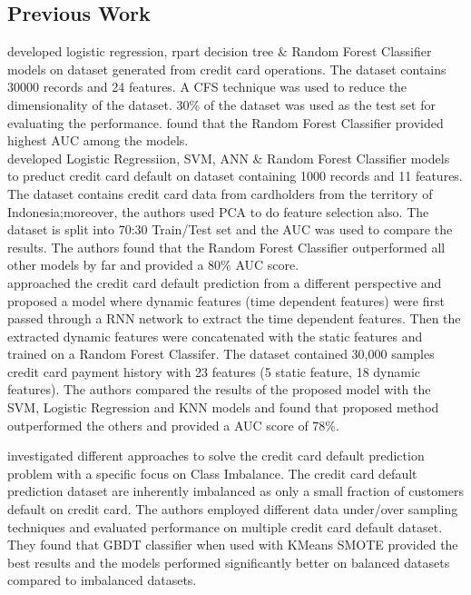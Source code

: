 \documentclass[twoside,11pt,a4paper]{article}
\begin{document}
\subsection{Previous Work}
\citep{sayjadah2018credit} developed logistic regression, rpart decision tree \& Random Forest Classifier models on dataset generated from credit card operations. The dataset contains 30000 records and 24 features. A \acf{CFS} technique was used to reduce the dimensionality of the dataset. 30\% of the dataset was used as the test set for evaluating the performance. \citep{sayjadah2018credit} found that the Random Forest Classifier provided highest \acf{AUC} among the models.\\

\citep{widyadhanacredit} developed Logistic Regressiion, \acs{SVM}, \acs{ANN} \& Random Forest Classifier models to preduct credit card default on dataset containing 1000 records and 11 features. The dataset contains credit card data from cardholders from the territory of Indonesia;moreover, the authors used \acf{PCA} to do feature selection also. The dataset is split into 70:30 Train/Test set and the \acs{AUC} was used to compare the results. The authors found that the Random Forest Classifier outperformed all other models by far and provided a 80\% \acs{AUC} score.\\

\citep{hsu2019enhanced} approached the credit card default prediction from a different perspective and proposed a model where dynamic features (time dependent features) were first passed through a \acf{RNN} network to extract the time dependent features. Then the extracted dynamic features were concatenated with the static features and trained on a Random Forest Classifer. The dataset contained 30,000 samples credit card payment history with 23 features (5 static feature, 18 dynamic features). The authors compared the results of the proposed model with the \acs{SVM}, Logistic Regression and KNN models and found that proposed method outperformed the others and provided a \acs{AUC} score of 78\%.

\citep{alam2020investigation} investigated different approaches to solve the credit card default prediction problem with a specific focus on Class Imbalance. The credit card default prediction dataset are inherently imbalanced as only a small fraction of customers default on credit card. The authors employed different data under/over sampling techniques and evaluated performance on multiple credit card default dataset. They found that \acs{GBDT} classifier when used with KMeans \acs{SMOTE} provided the best results and the models performed significantly better on balanced datasets compared to imbalanced datasets.
\end{document}
